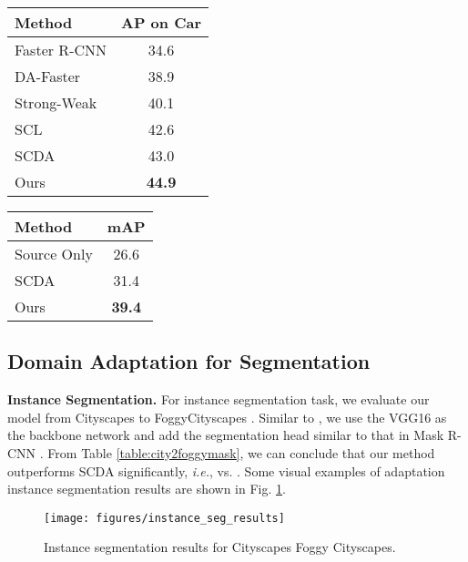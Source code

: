 \documentclass[runningheads]{llncs}
\def\ie{{\em i.e.}}
\begin{document}
\begin{table*}[t]
\begin{minipage}{0.49\linewidth}
\centering
\caption{Adaptation detection results from Sim10k to Cityscapes.}
\setlength{\tabcolsep}{9.5pt}
\begin{tabular}{l|c}
\hline\noalign{\smallskip}
Method & AP on Car \\
\hline
Faster R-CNN                   & 34.6    \\
DA-Faster \cite{DBLP:conf/cvpr/Chen0SDG18}& 38.9    \\
Strong-Weak \cite{DBLP:conf/cvpr/SaitoUHS19} & 40.1    \\
SCL \cite{DBLP:journals/corr/abs-1911-02559}         & 42.6    \\
SCDA \cite{DBLP:conf/cvpr/ZhuPYSL19}  & 43.0 \\
Ours                          & {\bf 44.9}    \\
\hline
\end{tabular}
\label{table:sim102city}
\end{minipage}
\begin{minipage}{0.49\linewidth}
\centering
\caption{Adaptation instance segmentation results from Cityscapes to FoggyCityscapes.}
\setlength{\tabcolsep}{9.5pt}
\begin{tabular}{l|c}
\hline\noalign{\smallskip}
Method & mAP \\
\hline
Source Only                   & 26.6    \\
SCDA \cite{DBLP:conf/cvpr/ZhuPYSL19}& 31.4    \\
Ours                          &{\bf 39.4}    \\
\hline
\end{tabular}
\label{table:city2foggymask}
\end{minipage}
\end{table*}

\subsection{Domain Adaptation for Segmentation}
\noindent \textbf{Instance Segmentation.}
For instance segmentation task, we evaluate our model from Cityscapes \cite{DBLP:conf/cvpr/CordtsORREBFRS16} to FoggyCityscapes \cite{DBLP:journals/ijcv/SakaridisDG18}. Similar to \cite{DBLP:conf/cvpr/ZhuPYSL19}, we use the VGG16 as the backbone network and add the segmentation head similar to that in Mask R-CNN \cite{DBLP:conf/iccv/HeGDG17}. From Table \ref{table:city2foggymask}, we can conclude that our method outperforms SCDA \cite{DBLP:conf/cvpr/ZhuPYSL19} significantly, \ie,  vs. . Some visual examples of adaptation instance segmentation results are shown in Fig. \ref{fig:instance}.
\begin{figure}[t]
\centering
\texttt{[image: figures/instance\_seg\_results]}
\caption{Instance segmentation results for Cityscapes  Foggy Cityscapes.}
\label{fig:instance}
\end{figure}
\end{document}
